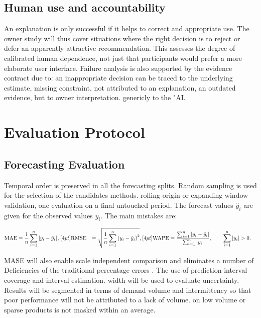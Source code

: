 \documentclass[a4paper,11pt,oneside]{book}
\theoremstyle{plain}
\theoremstyle{definition}
\theoremstyle{remark}
\let\\\space
\begin{document}
\subsection{Human use and accountability}
\label{subsec:human_use_accountability}

An explanation is only successful if it helps to correct and appropriate use. The owner study will thus cover situations where the right decision is to reject or defer an apparently attractive recommendation. This assesses the degree of calibrated human dependence, not just that participants would prefer a more elaborate user interface. Failure analysis is also supported by the evidence contract due to: an inappropriate decision can be traced to the underlying estimate, missing constraint, not attributed to an explanation, an outdated evidence, but to owner interpretation. genericly to the "AI.

\section{Evaluation Protocol}
\label{sec:evaluation_protocol}

\subsection{Forecasting Evaluation}
\label{subsec:forecasting_evaluation}

Temporal order is preserved in all the forecasting splits. Random sampling is used for the selection of the candidates methods. rolling origin or expanding window validation, one evaluation on a final untouched period. The forecast values \(\hat{y}_i\) are given for the observed values \(y_i\). The main mistakes are:

\begin{align}
\mathrm{MAE} &= \frac{1}{n}\sum_{i=1}^{n}\left|y_i-\hat{y}_i\right|, \\[4pt]
\mathrm{RMSE} &= \sqrt{\frac{1}{n}\sum_{i=1}^{n}\left(y_i-\hat{y}_i\right)^2}, \\[4pt]
\mathrm{WAPE} &= \frac{\sum_{i=1}^{n}\left|y_i-\hat{y}_i\right|}{\sum_{i=1}^{n}|y_i|},
\qquad \sum_{i=1}^{n}|y_i|>0.
\end{align}

MASE will also enable scale independent comparison and eliminates a number of Deficiencies of the traditional percentage errors \cite{hyndman2006accuracy}. The use of prediction interval coverage and interval estimation. width will be used to evaluate uncertainty. Results will be segmented in terms of demand volume and intermittency so that poor performance will not be attributed to a lack of volume. on low volume or sparse products is not masked within an average.
\end{document}
